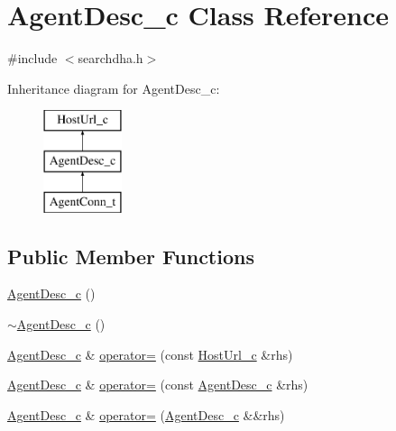 \hypertarget{classAgentDesc__c}{\section{Agent\-Desc\-\_\-c Class Reference}
\label{classAgentDesc__c}
}


{\ttfamily \#include $<$searchdha.\-h$>$}

Inheritance diagram for Agent\-Desc\-\_\-c\-:\begin{figure}[H]
\begin{center}
\leavevmode
\includegraphics[height=3.000000cm]{classAgentDesc__c}
\end{center}
\end{figure}
\subsection*{Public Member Functions}
\begin{DoxyCompactItemize}
\item 
\hyperlink{classAgentDesc__c_a7b26d0b963e132152663378340e44fd6}{Agent\-Desc\-\_\-c} ()
\item 
\hyperlink{classAgentDesc__c_a60df4dbd67b381d928918d0e38800ead}{$\sim$\-Agent\-Desc\-\_\-c} ()
\item 
\hyperlink{classAgentDesc__c}{Agent\-Desc\-\_\-c} \& \hyperlink{classAgentDesc__c_a18eb939819c8178a5813e13df551f44d}{operator=} (const \hyperlink{classHostUrl__c}{Host\-Url\-\_\-c} \&rhs)
\item 
\hyperlink{classAgentDesc__c}{Agent\-Desc\-\_\-c} \& \hyperlink{classAgentDesc__c_aeef215f35a24428a659e051528fcef4d}{operator=} (const \hyperlink{classAgentDesc__c}{Agent\-Desc\-\_\-c} \&rhs)
\item 
\hyperlink{classAgentDesc__c}{Agent\-Desc\-\_\-c} \& \hyperlink{classAgentDesc__c_a6a7e2fbc9dd11a03330c520756d7b14e}{operator=} (\hyperlink{classAgentDesc__c}{Agent\-Desc\-\_\-c} \&\&rhs)
\end{DoxyCompactItemize}
